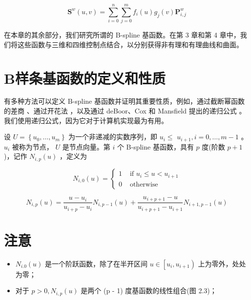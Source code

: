 \documentclass[../main.tex]{subfiles}
\begin{document}
\[
{\mathbf{S}}^{w}\left( {u,v}\right)  = \mathop{\sum }\limits_{{i = 0}}^{n}\mathop{\sum }\limits_{{j = 0}}^{m}{f}_{i}\left( u\right) {g}_{j}\left( v\right) {\mathbf{P}}_{i,j}^{w} \tag{2.4}
\]

在本章的其余部分，我们研究所谓的 B-spline 基函数。在第 3 章和第 4 章中，我们将这些函数与三维和四维控制点结合，以分别获得非有理和有理曲线和曲面。


\section{B样条基函数的定义和性质}

有多种方法可以定义 B-spline 基函数并证明其重要性质，例如，通过截断幂函数的差商 \cite{Curr47,Scho46}、通过开花法 \cite{Rams87}，以及通过 deBoor、Cox 和 Mansfield 提出的递归公式 \cite{Cox72,DeBo72,DeBo78}。我们使用递归公式，因为它对于计算机实现最为有用。

设 \(U = \left\{  {{u}_{0},\ldots ,{u}_{m}}\right\}\) 为一个非递减的实数序列，即 \({u}_{i} \leq\)  \({u}_{i + 1},i = 0,\ldots ,m - 1\) 。 \({u}_{i}\) 被称为节点， \(U\) 是节点向量。第 \(i\) 个 B-spline 基函数，具有 \(p\) 度(阶数 \(p + 1\) )，记作 \({N}_{i,p}\left( u\right)\) ，定义为

\[
{N}_{i,0}\left( u\right)  = \left\{  \begin{array}{ll} 1 & \text{ if }{u}_{i} \leq  u < {u}_{i + 1} \\  0 & \text{ otherwise } \end{array}\right.
\]

\[
{N}_{i,p}\left( u\right)  = \frac{u - {u}_{i}}{{u}_{i + p} - {u}_{i}}{N}_{i,p - 1}\left( u\right)  + \frac{{u}_{i + p + 1} - u}{{u}_{i + p + 1} - {u}_{i + 1}}{N}_{i + 1,p - 1}\left( u\right)  \tag{2.5}
\]

\section*{注意}

\begin{itemize}
\item \({N}_{i.0}\left( u\right)\) 是一个阶跃函数，除了在半开区间 \(u \in  \left\lbrack  {{u}_{i},{u}_{i + 1}}\right)\) 上为零外，处处为零；
\end{itemize}

\begin{itemize}
\item 对于 \(p > 0,{N}_{i,p}\left( u\right)\) 是两个 (p - 1) 度基函数的线性组合(图 2.3)；
\end{itemize}
\end{document}
